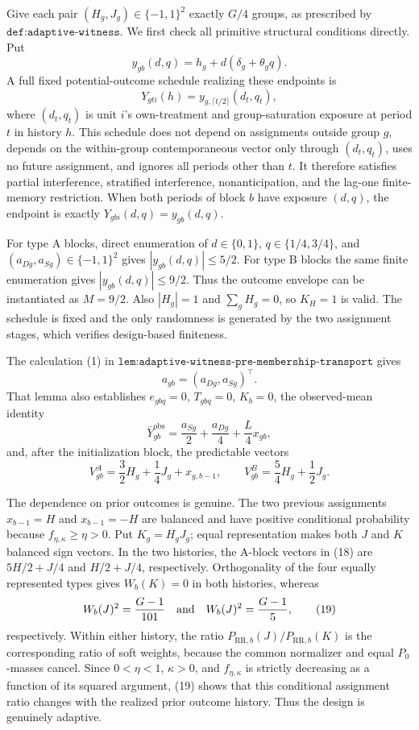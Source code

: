 Give each pair \((H_g,J_g)\in\{-1,1\}^2\) exactly \(G/4\) groups, as prescribed by \(\texttt{def:adaptive-witness}\).  We first check all primitive structural conditions directly.  Put
\[
y_{gb}(d,q)=h_g+d(\delta_g+\theta_gq).
\]
A full fixed potential-outcome schedule realizing these endpoints is
\[
Y_{gti}(h)=y_{g,\lceil t/2\rceil}(d_t,q_t),
\]
where \((d_t,q_t)\) is unit \(i\)'s own-treatment and group-saturation exposure at period \(t\) in history \(h\).  This schedule does not depend on assignments outside group \(g\), depends on the within-group contemporaneous vector only through \((d_t,q_t)\), uses no future assignment, and ignores all periods other than \(t\).  It therefore satisfies partial interference, stratified interference, nonanticipation, and the lag-one finite-memory restriction.  When both periods of block \(b\) have exposure \((d,q)\), the endpoint is exactly \(Y_{gbi}(d,q)=y_{gb}(d,q)\).

For type A blocks, direct enumeration of \(d\in\{0,1\}\), \(q\in\{1/4,3/4\}\), and \((a_{Dg},a_{Sg})\in\{-1,1\}^2\) gives \(|y_{gb}(d,q)|\leq5/2\).  For type B blocks the same finite enumeration gives \(|y_{gb}(d,q)|\leq9/2\).  Thus the outcome envelope can be instantiated as \(M=9/2\).  Also \(|H_g|=1\) and \(\sum_gH_g=0\), so \(K_H=1\) is valid.  The schedule is fixed and the only randomness is generated by the two assignment stages, which verifies design-based finiteness.

The calculation (1) in \(\texttt{lem:adaptive-witness-pre-membership-transport}\) gives
\[
a_{gb}=(a_{Dg},a_{Sg})^\top.                              \tag{16}
\]
That lemma also establishes \(e_{gbq}=0\), \(T_{gbq}=0\), \(K_b=0\), the observed-mean identity
\[
\bar Y^{\mathrm{obs}}_{gb}
=\frac{a_{Sg}}2+\frac{a_{Dg}}4+\frac L4x_{gb},            \tag{17}
\]
and, after the initialization block, the predictable vectors
\[
V_{gb}^{A}=\frac32H_g+\frac14J_g+x_{g,b-1},
\qquad
V_{gb}^{B}=\frac54H_g+\frac12J_g.                        \tag{18}
\]

The dependence on prior outcomes is genuine.  The two previous assignments \(x_{b-1}=H\) and \(x_{b-1}=-H\) are balanced and have positive conditional probability because \(f_{\eta,\kappa}\geq\eta>0\).  Put \(K_g=H_gJ_g\); equal representation makes both \(J\) and \(K\) balanced sign vectors.  In the two histories, the A-block vectors in (18) are \(5H/2+J/4\) and \(H/2+J/4\), respectively.  Orthogonality of the four equally represented types gives \(W_b(K)=0\) in both histories, whereas
\[
W_b(J)^2=\frac{G-1}{101}
\quad\hbox{and}\quad
W_b(J)^2=\frac{G-1}{5},                                   \tag{19}
\]
respectively.  Within either history, the ratio \(P_{\mathrm{RR},b}(J)/P_{\mathrm{RR},b}(K)\) is the corresponding ratio of soft weights, because the common normalizer and equal \(P_0\)-masses cancel.  Since \(0<\eta<1\), \(\kappa>0\), and \(f_{\eta,\kappa}\) is strictly decreasing as a function of its squared argument, (19) shows that this conditional assignment ratio changes with the realized prior outcome history.  Thus the design is genuinely adaptive.

